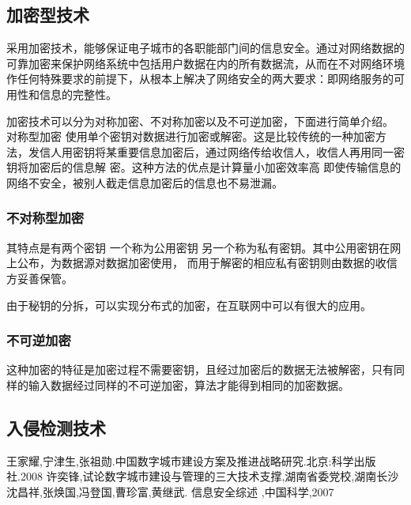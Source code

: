 \documentclass[a4paper]{ctexart}
\begin{document}
    \subsection{加密型技术}
    \par 采用加密技术，能够保证电子城市的各职能部门间的信息安全。通过对网络数据的可靠加密来保护网络系统中包括用户数据在内的所有数据流，从而在不对网络环境作任何特殊要求的前提下，从根本上解决了网络安全的两大要求：即网络服务的可用性和信息的完整性。
    \par 加密技术可以分为对称加密、不对称加密以及不可逆加密，下面进行简单介绍。 
    对称型加密 使用单个密钥对数据进行加密或解密。这是比较传统的一种加密方法，发信人用密钥将某重要信息加密后，通过网络传给收信人，收信人再用同一密钥将加密后的信息解 密。这种方法的优点是计算量小加密效率高 即使传输信息的网络不安全，被别人截走信息加密后的信息也不易泄漏。

    \subsubsection{不对称型加密} 
    \par 其特点是有两个密钥 一个称为公用密钥 另一个称为私有密钥。其中公用密钥在网上公布，为数据源对数据加密使用， 而用于解密的相应私有密钥则由数据的收信方妥善保管。
    \par 由于秘钥的分拆，可以实现分布式的加密，在互联网中可以有很大的应用。

    \subsubsection{不可逆加密} 
    \par 这种加密的特征是加密过程不需要密钥，且经过加密后的数据无法被解密，只有同样的输入数据经过同样的不可逆加密，算法才能得到相同的加密数据。

    \subsection{入侵检测技术}

    \begin{thebibliography}{sotief}
             王家耀,宁津生,张祖勋.中国数字城市建设方案及推进战略研究.北京:科学出版社.2008
            许奕锋,试论数字城市建设与管理的三大技术支撑,湖南省委党校,湖南长沙
             沈昌祥,张焕国,冯登国,曹珍富,黄继武. 信息安全综述 ,中国科学,2007
    \end{thebibliography}
\end{document}
